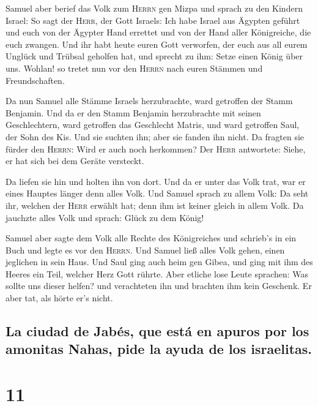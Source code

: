  Samuel aber berief das Volk zum \textsc{Herrn} gen Mizpa
 und sprach zu den Kindern Israel: So sagt der
\textsc{Herr}, der Gott Israels: Ich habe Israel aus Ägypten geführt und
euch von der Ägypter Hand errettet und von der Hand aller Königreiche,
die euch zwangen.  Und ihr habt heute euren Gott
verworfen, der euch aus all eurem Unglück und Trübsal geholfen hat, und
sprecht zu ihm: Setze einen König über uns. Wohlan! so tretet nun vor
den \textsc{Herrn} nach euren Stämmen und Freundschaften.

 Da nun Samuel alle Stämme Israels herzubrachte, ward
getroffen der Stamm Benjamin.  Und da er den Stamm
Benjamin herzubrachte mit seinen Geschlechtern, ward getroffen das
Geschlecht Matris, und ward getroffen Saul, der Sohn des Kis. Und sie
suchten ihn; aber sie fanden ihn nicht.  Da fragten sie
fürder den \textsc{Herrn}: Wird er auch noch herkommen? Der
\textsc{Herr} antwortete: Siehe, er hat sich bei dem Geräte versteckt.

 Da liefen sie hin und holten ihn von dort. Und da er
unter das Volk trat, war er eines Hauptes länger denn alles Volk.
 Und Samuel sprach zu allem Volk: Da seht ihr, welchen
der \textsc{Herr} erwählt hat; denn ihm ist keiner gleich in allem Volk.
Da jauchzte alles Volk und sprach: Glück zu dem König!

 Samuel aber sagte dem Volk alle Rechte des Königreiches
und schrieb's in ein Buch und legte es vor den \textsc{Herrn}. Und
Samuel ließ alles Volk gehen, einen jeglichen in sein Haus.
 Und Saul ging auch heim gen Gibea, und ging mit ihm des
Heeres ein Teil, welcher Herz Gott rührte.  Aber etliche
lose Leute sprachen: Was sollte uns dieser helfen? und verachteten ihn
und brachten ihm kein Geschenk. Er aber tat, als hörte er's nicht.

\hypertarget{la-ciudad-de-jabuxe9s-que-estuxe1-en-apuros-por-los-amonitas-nahas-pide-la-ayuda-de-los-israelitas.}{%
\subsection{La ciudad de Jabés, que está en apuros por los amonitas
Nahas, pide la ayuda de los
israelitas.}\label{la-ciudad-de-jabuxe9s-que-estuxe1-en-apuros-por-los-amonitas-nahas-pide-la-ayuda-de-los-israelitas.}}

\hypertarget{section-10}{%
\section{11}\label{section-10}}

